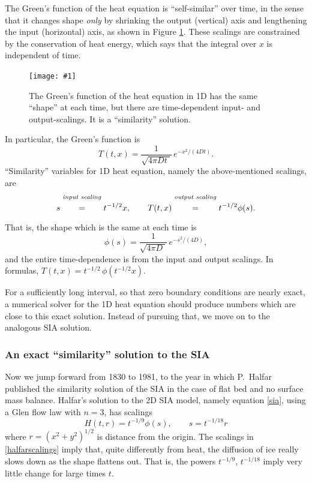 \documentclass[titlepage,letterpaper,final,12pt]{scrartcl}
\newcommand{\onefigsize}[3]{
\begin{figure}[ht]
\centering
\texttt{[image: \#1]}
\caption{#2}
\label{fig:#1}
\end{figure}}
\newcommand{\onefig}[2]{\onefigsize{#1}{#2}{3.0in}}
\begin{document}
The Green's function of the heat equation is ``self-similar'' over time, in the sense that it changes shape \emph{only} by shrinking the output (vertical) axis and lengthening the input (horizontal) axis, as shown in Figure \ref{fig:heatscaling}.  These scalings are constrained by the conservation of heat energy, which says that the integral over $x$ is independent of time.

\onefig{heatscaling}{The Green's function of the heat equation in 1D has the same ``shape'' at each time, but there are time-dependent input- and output-scalings.  It is a ``similarity'' solution.}

In particular, the Green's function is
	$$T(t,x) = \frac{1}{\sqrt{4 \pi D t \;}}\, e^{-x^2/(4Dt)}.$$
``Similarity'' variables for 1D heat equation, namely the above-mentioned scalings, are
	$$s \stackrel{\text{\emph{input scaling}}}{\phantom{\Big|}=\phantom{\Big|}} t^{-1/2} x, \qquad T(t,x) \stackrel{\text{\emph{output scaling}}}{\phantom{\Big|}=\phantom{\Big|}} t^{-1/2} \phi(s).$$
That is, the shape which is the same at each time is
	$$\phi(s) = \frac{1}{\sqrt{4 \pi D \;}}\, e^{-s^2/(4D)},$$
and the entire time-dependence is from the input and output scalings.  In formulas, $T(t,x) = t^{-1/2}\, \phi\left(t^{-1/2} x\right)$.

For a sufficiently long interval, so that zero boundary conditions are nearly exact, a numerical solver for the 1D heat equation should produce numbers which are close to this exact solution.  Instead of pursuing that, we move on to the analogous SIA solution.

\subsubsection*{An exact ``similarity'' solution to the SIA}

Now we jump forward from 1830 to 1981, to the year in which P.~Halfar published the similarity solution of the SIA in the case of flat bed and no surface mass balance.
Halfar's solution to the 2D SIA model, namely equation \eqref{sia}, using a Glen flow law with $n=3$, has scalings
\begin{equation}
H(t,r)=t^{-1/9} \phi(s), \qquad s = t^{-1/18} r \label{halfarscalings}
\end{equation}
where $r=(x^2+y^2)^{1/2}$ is distance from the origin.  The scalings in \eqref{halfarscalings} imply that, quite differently from heat, the diffusion of ice really slows down as the shape flattens out.  That is, the powers $t^{-1/9}$, $t^{-1/18}$ imply very little change for large times $t$.
\end{document}
